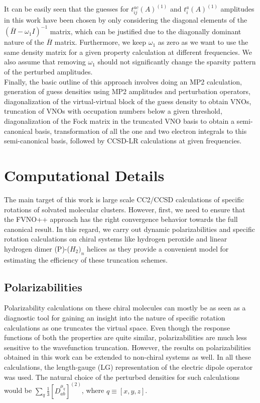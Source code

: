 It can be easily seen that the guesses for $t^{ac}_{ij}(A)^{(1)}$ and 
$t^{a}_{i}(A)^{(1)}$ amplitudes in this work have been chosen by 
only considering the diagonal elements of the $(\bar{H} -\omega_1 I)^{-1}$
matrix, which can be justified due to the diagonally dominant nature of the
$\bar{H}$ matrix. Furthermore, we keep $\omega_1$ as zero as we 
want to use the same density matrix for a given property calculation at different frequencies. We also assume that removing $\omega_1$ should not significantly change the sparsity pattern of the perturbed amplitudes. \\
Finally, the basic outline of this approach involves doing an MP2 calculation, 
generation of guess densities using MP2 amplitudes and perturbation operators, 
diagonalization of the virtual-virtual block of the guess density 
to obtain VNOs, truncation of VNOs with occupation numbers below a given threshold, diagonalization of the Fock matrix in the truncated VNO basis to obtain a semi-canonical basis, transformation of all the one and two electron integrals to this semi-canonical basis, followed by CCSD-LR calculations at given frequencies.

\section{Computational Details}

The main target of this work is large scale CC2\cite{Christiansen95:CC2}/CCSD calculations of specific rotations of solvated molecular clusters. However, first, we need to ensure that the FVNO++ approach has the right convergence behavior towards the full canonical result. In this regard, we carry out dynamic polarizabilities and specific rotation calculations on chiral systems like hydrogen peroxide and linear hydrogen dimer (P)-($H_2)_n$ helices as they provide a convenient model for estimating the efficiency of these truncation schemes. 

\subsection{Polarizabilities}

Polarizability calculations on these chiral molecules can mostly be as seen as a diagnostic tool for gaining an insight into the nature of specific rotation calculations as one truncates the virtual space. Even though the response functions of both the properties are quite similar, polarizabilities are much less sensitive to the wavefunction truncation. However, the results on polarizabilities obtained in this work can be extended to non-chiral systems as well. In all these calculations, the length-gauge (LG) representation of the electric dipole operator was used. The natural choice of the perturbed densities for such calculations would be $\sum\limits_q \frac{1}{3}[{D^{\mu_q}_{ab}}]^{(2)}$,
where $q \equiv [x,y,z]$.

